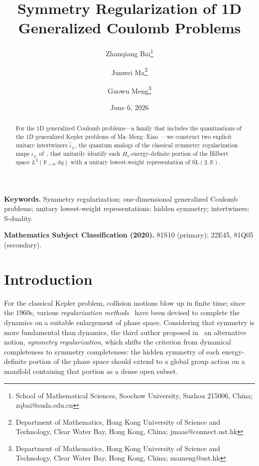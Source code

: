 \documentclass[11pt]{article}
\title{Symmetry Regularization of 1D Generalized Coulomb Problems}
\author{Zhanqiang Bai\thanks{School of Mathematical Sciences, Soochow University, Suzhou 215006, China; zqbai@suda.edu.cn}
\and Junwei Ma\thanks{Department of Mathematics, Hong Kong University of Science and Technology, Clear Water Bay, Hong Kong, China; jmaas@connect.ust.hk}
\and Guowu Meng\thanks{Department of Mathematics, Hong Kong University of Science and Technology, Clear Water Bay, Hong Kong, China; mameng@ust.hk}}
\date{June 6, 2026}
\theoremstyle{plain}
\theoremstyle{definition}
\theoremstyle{remark}
\newcommand{\R}{\mathbb{R}}
\newcommand{\SLt}{\widetilde{\mathrm{SL}}}
\begin{document}
\maketitle

\begin{abstract}
For the 1D generalized Coulomb problems---a family that includes the quantizations of the 1D generalized Kepler problems of Ma--Meng--Xiao~\cite{MMX2025}---we construct two explicit unitary intertwiners $\hat\iota_{\pm}$, the quantum analogs of the classical symmetry regularization maps $\iota_{\pm}$ of~\cite{MMX2025}, that unitarily identify each $H_{\kappa}$-energy-definite portion of the Hilbert space $L^{2}(\R_{>0},\mathrm{d}q)$ with a unitary lowest-weight representation of $\SLt(2,\R)$.
\end{abstract}

\medskip
\noindent\textbf{Keywords.} Symmetry regularization; one-dimensional generalized Coulomb problems; unitary lowest-weight representations; hidden symmetry; intertwiners; S-duality.

\medskip
\noindent\textbf{Mathematics Subject Classification (2020).} 81S10 (primary); 22E45, 81Q05 (secondary).

\tableofcontents

\section{Introduction}

For the classical Kepler problem, collision motions blow up in finite time;
since the 1960s, various \emph{regularization methods}~\cite{KustaanheimoStiefel1965,Moser1970} have been devised to
complete the dynamics on a suitable enlargement of phase space. Considering
that symmetry is more fundamental than dynamics, the third author proposed
in~\cite{Meng2023} an alternative notion, \emph{symmetry regularization},
which shifts the criterion from dynamical completeness to symmetry
completeness: the hidden symmetry of each energy-definite portion of the phase space should extend to a global group action on a manifold containing that portion as a dense open subset.
\end{document}
